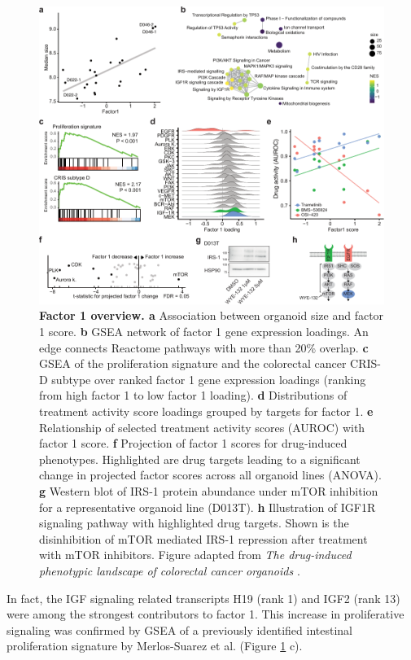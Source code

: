 \begin{flushleft}
\begin{figure}[h!]
\centering
\includegraphics[width=\textwidth,
                height=\textheight,
                keepaspectratio]{figures/promise/pdf/fig_6_1.pdf}
\caption{\textbf{Factor 1 overview. a} Association between organoid size and factor 1 score. \textbf{b} GSEA network of factor 1 gene expression loadings. An edge connects Reactome pathways with more than 20\% overlap. \textbf{c} GSEA of the proliferation signature and the colorectal cancer CRIS-D subtype over ranked factor 1 gene expression loadings (ranking from high factor 1 to low factor 1 loading). \textbf{d} Distributions of treatment activity score loadings grouped by targets for factor 1. \textbf{e} Relationship of selected treatment activity scores (AUROC) with factor 1 score. \textbf{f} Projection of factor 1 scores for drug-induced phenotypes. Highlighted are drug targets leading to a significant change in projected factor scores across all organoid lines (ANOVA). \textbf{g} Western blot of IRS-1 protein abundance under mTOR inhibition for a representative organoid line (D013T). \textbf{h} Illustration of IGF1R signaling pathway with highlighted drug targets. Shown is the disinhibition of mTOR mediated IRS-1 repression after treatment with mTOR inhibitors. Figure adapted from \textit{The drug-induced phenotypic landscape of colorectal cancer organoids} \cite{Betge2022-kr}.}
\label{fig_261}
\end{figure}
\bigbreak

In fact, the IGF signaling related transcripts H19 (rank 1) and IGF2 (rank 13) were among the strongest contributors to factor 1. This increase in proliferative signaling was confirmed by GSEA of a previously identified intestinal proliferation signature by Merlos-Suarez et al. \cite{Merlos-Suarez2011-gd} (Figure \ref{fig_261} c). 


\end{flushleft}
